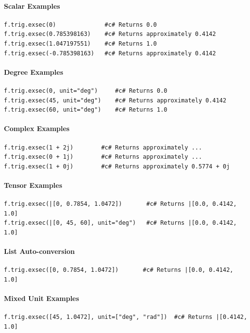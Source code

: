 \paragraph{Scalar Examples}
\begin{verbatim}
f.trig.exsec(0)              #c# Returns 0.0
f.trig.exsec(0.785398163)    #c# Returns approximately 0.4142
f.trig.exsec(1.047197551)    #c# Returns 1.0
f.trig.exsec(-0.785398163)   #c# Returns approximately 0.4142
\end{verbatim}

\paragraph{Degree Examples}
\begin{verbatim}
f.trig.exsec(0, unit="deg")     #c# Returns 0.0
f.trig.exsec(45, unit="deg")    #c# Returns approximately 0.4142
f.trig.exsec(60, unit="deg")    #c# Returns 1.0
\end{verbatim}

\paragraph{Complex Examples}
\begin{verbatim}
f.trig.exsec(1 + 2j)        #c# Returns approximately ...
f.trig.exsec(0 + 1j)        #c# Returns approximately ...
f.trig.exsec(1 + 0j)        #c# Returns approximately 0.5774 + 0j
\end{verbatim}

\paragraph{Tensor Examples}
\begin{verbatim}
f.trig.exsec(|[0, 0.7854, 1.0472])       #c# Returns |[0.0, 0.4142, 1.0]
f.trig.exsec(|[0, 45, 60], unit="deg")   #c# Returns |[0.0, 0.4142, 1.0]
\end{verbatim}

\paragraph{List Auto-conversion}
\begin{verbatim}
f.trig.exsec([0, 0.7854, 1.0472])       #c# Returns |[0.0, 0.4142, 1.0]
\end{verbatim}

\paragraph{Mixed Unit Examples}
\begin{verbatim}
f.trig.exsec([45, 1.0472], unit=["deg", "rad"])  #c# Returns |[0.4142, 1.0]
\end{verbatim}

